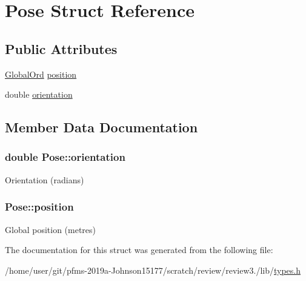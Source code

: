 \hypertarget{structPose}{}\section{Pose Struct Reference}
\label{structPose}
\subsection*{Public Attributes}
\begin{DoxyCompactItemize}
\item 
\hyperlink{structGlobalOrd}{Global\+Ord} \hyperlink{structPose_aba2eb8f799d1d392757d6c9490179720}{position}
\item 
double \hyperlink{structPose_a94d058eaab99263c6ab43bf53f4ebd9a}{orientation}
\end{DoxyCompactItemize}


\subsection{Member Data Documentation}
\subsubsection[{\texorpdfstring{orientation}{orientation}}]{\setlength{\rightskip}{0pt plus 5cm}double Pose\+::orientation}\hypertarget{structPose_a94d058eaab99263c6ab43bf53f4ebd9a}{}\label{structPose_a94d058eaab99263c6ab43bf53f4ebd9a}
Orientation (radians) 
\subsubsection[{\texorpdfstring{position}{position}}]{ Pose\+::position}\hypertarget{structPose_aba2eb8f799d1d392757d6c9490179720}{}\label{structPose_aba2eb8f799d1d392757d6c9490179720}
Global position (metres) 

The documentation for this struct was generated from the following file\+:\begin{DoxyCompactItemize}
\item 
/home/user/git/pfms-\/2019a-\/\+Johnson15177/scratch/review/review3./lib/\hyperlink{types_8h}{types.\+h}\end{DoxyCompactItemize}
